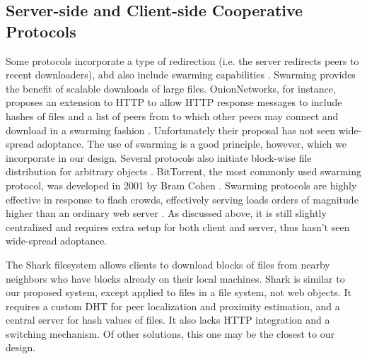 \subsection{Server-side and Client-side Cooperative Protocols} 

Some protocols incorporate a type of redirection (i.e. the server redirects peers to recent downloaders), abd also include swarming capabilities \cite{overhaul, webtorrent, onion}.  Swarming provides the benefit of scalable downloads of large files.  OnionNetworks, for instance, proposes an extension to HTTP to allow HTTP response messages to include hashes of files and a list of peers from to which other peers may connect and download in a swarming fashion \cite{onion}.  Unfortunately their proposal has not seen wide-spread adoptance.  The use of swarming is a good principle, however, which we incorporate in our design.  Several protocols also initiate block-wise file distribution for arbitrary objects \cite{zappala, cohen, slurpie, mutualcast, fastreplica, avalanche, bullet_prime}.  BitTorrent, the most commonly used swarming protocol, was developed in 2001 by Bram Cohen \cite{cohen}.  Swarming protocols are highly effective in response to flash crowds, effectively serving loads orders of magnitude higher than an ordinary web server \cite{zappala}. As discussed above, it is still slightly centralized and requires extra setup for both client and server, thus hasn't seen wide-spread adoptance.

The Shark \cite{shark} filesystem allows clients to download blocks of files from nearby neighbors who have blocks already on their local machines. 
Shark is similar to our proposed system, except applied to files in a file system, not web objects.  It  requires a custom DHT for peer localization and proximity estimation, and a central server for hash values of files.  It also lacks HTTP integration and a switching mechanism.  Of other solutions, this one may be the closest to our design.

